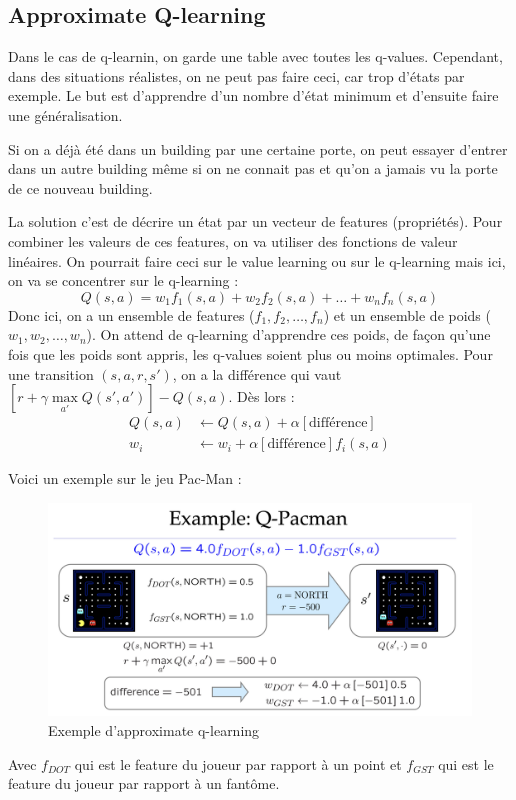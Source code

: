 \subsection{Approximate Q-learning} %
Dans le cas de q-learnin, on garde une table avec toutes les q-values. Cependant, dans des situations réalistes, on ne peut pas
faire ceci, car trop d'états par exemple. Le but est d'apprendre d'un nombre d'état minimum et d'ensuite faire une généralisation.
\begin{example}
    Si on a déjà été dans un building par une certaine porte, on peut essayer d'entrer dans un autre building même si on ne 
    connait pas et qu'on a jamais vu la porte de ce nouveau building.
\end{example}

La solution c'est de décrire un état par un vecteur de features (propriétés). Pour combiner les valeurs de ces features, on 
va utiliser des fonctions de valeur linéaires. On pourrait faire ceci sur le value learning ou sur le q-learning mais ici, on
va se concentrer sur le q-learning :
\begin{equation}
    Q(s,a)=w_1f_1(s,a)+w_2f_2(s,a)+\dots+w_nf_n(s,a)
    \label{eq:approx_q_learning}
\end{equation}
Donc ici, on a un ensemble de features ($f_1,f_2,\dots,f_n$) et un ensemble de poids ($w_1,w_2,\dots,w_n$). On attend de q-learning
d'apprendre ces poids, de façon qu'une fois que les poids sont appris, les q-values soient plus ou moins optimales.
Pour une transition $(s,a,r,s')$, on a la différence qui vaut $[r+\gamma\max\limits_{a'}Q(s',a')]-Q(s,a)$. Dès lors :
\begin{equation*}
    \begin{aligned}
        Q(s,a) &\leftarrow Q(s,a)+\alpha[\text{différence}]\\
        w_i &\leftarrow w_i+\alpha[\text{différence}]f_i(s,a)
    \end{aligned}
\end{equation*}
\begin{example} Voici un exemple sur le jeu Pac-Man :
    \begin{figure}[H]
        \centering
        \includegraphics[width=0.7\linewidth]{pictures/q-pacman.png}
        \caption{Exemple d'approximate q-learning}
        \label{fig:approx_q_learning}
    \end{figure}
    Avec $f_{DOT}$ qui est le feature du joueur par rapport à un point et $f_{GST}$ qui est le feature du joueur par rapport à un
    fantôme.\\
\end{example}